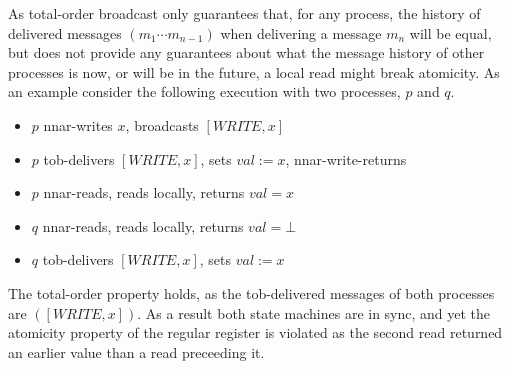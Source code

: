 \documentclass[a4paper]{scrreprt}
\begin{document}
As total-order broadcast only guarantees that, for any process, the history of
delivered messages $(m_1 \cdots m_{n-1})$ when delivering a message $m_n$ will
be equal, but does not provide any guarantees about what the message history of
other processes is now, or will be in the future, a local read might break
atomicity. As an example consider the following execution with two processes,
$p$ and $q$.

\begin{itemize}
	\item $p$ nnar-writes $x$, broadcasts $[WRITE, x]$
	\item $p$ tob-delivers $[WRITE, x]$, sets $val := x$, nnar-write-returns
	\item $p$ nnar-reads, reads locally, returns $val = x$
	\item $q$ nnar-reads, reads locally, returns $val = \bot$
	\item $q$ tob-delivers  $[WRITE, x]$, sets $val := x$
\end{itemize}

The total-order property holds, as the tob-delivered messages of both processes
are $([WRITE, x])$. As a result both state machines are in sync, and yet the
atomicity property of the regular register is violated as the second read
returned an earlier value than a read preceeding it.
\end{document}
